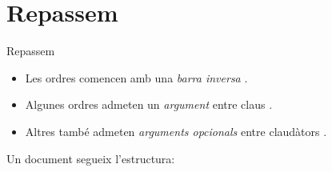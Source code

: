 
\date{}

\subtitle{Repàs}



\begin{frame}
\titlepage
\end{frame}

\section{Repassem}

\begin{frame}[fragile]{Repassem}
\begin{itemize}
\item Les ordres comencen amb una \emph{barra inversa} \keystrokebftt{\bs}.
\item Algunes ordres admeten un \emph{argument} entre claus \keystrokebftt{\{}
\keystrokebftt{\}}.
\item Altres també admeten \emph{arguments opcionals} entre claudàtors \keystrokebftt{[} \keystrokebftt{]}.
\end{itemize}
Un document segueix l'estructura:
\end{frame}

